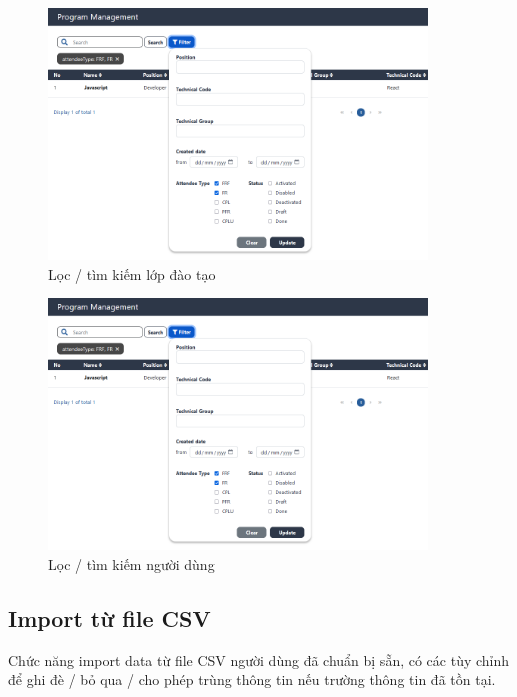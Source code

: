 \documentclass[report.tex]{subfiles}
\begin{document}
\begin{figure}[!htb]
{\centering
\includegraphics[width=380px]{../meta/ui.program-filter.png}
\caption{Lọc / tìm kiếm lớp đào tạo}
\par
}
\end{figure}
\FloatBarrier

\begin{figure}[!htb]
{\centering
\includegraphics[width=380px]{../meta/ui.program-filter.png}
\caption{Lọc / tìm kiếm người dùng}
\par
}
\end{figure}
\FloatBarrier

\subsection{Import từ file CSV}

Chức năng import data từ file CSV người dùng đã chuẩn bị sẵn, có các tùy chỉnh 
để ghi đè / bỏ qua / cho phép trùng thông tin nếu trường thông tin đã tồn tại.
\end{document}
